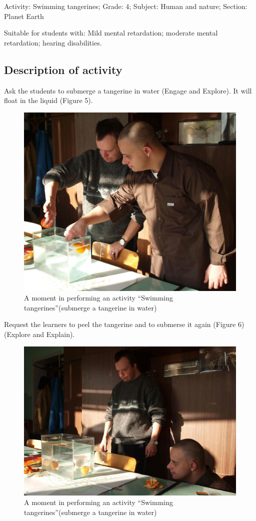 \documentclass[11.5pt]{sig-alternate} %
\begin{document}
\begin{large}
Activity: Swimming tangerines; Grade: 4; Subject: Human and nature; Section: Planet Earth

Suitable for students with: Mild mental retardation; moderate mental retardation; hearing disabilities.

\subsection*{Description of activity}

Ask the students to submerge a tangerine in water (Engage and Explore). It will float in the liquid (Figure 5). 
 
\begin{figure}[h]
    \centering
    \includegraphics[width=0.9\linewidth]{images/fig5.jpg}
    \caption{A moment in performing an activity “Swimming tangerines”(submerge a tangerine in water)}
\end{figure}

Request the learners to peel the tangerine and to submerse it again (Figure 6) (Explore and Explain).
 
\begin{figure}[h]
    \centering
    \includegraphics[width=0.95\linewidth]{images/fig6.jpg}
    \caption{A moment in performing an activity “Swimming tangerines”(submerge a tangerine in water)}
\end{figure}
\newpage

\end{large}
\end{document}
